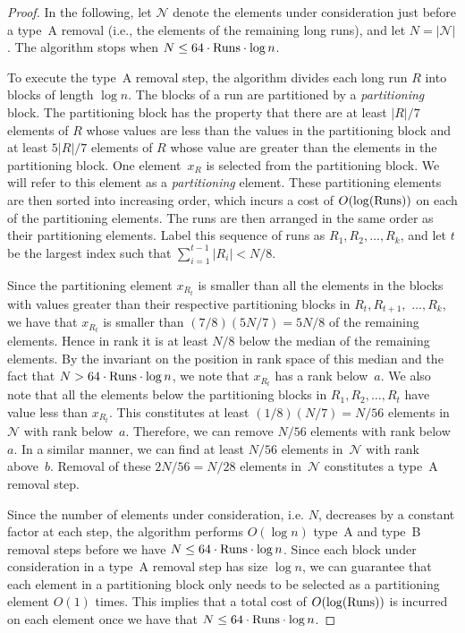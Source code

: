 \begin{proof}
In the following, let $\mathcal{N}$ denote the elements under
consideration just before a type~A removal (i.e., the elements of the
remaining long runs), and let $N = |\mathcal{N}|$. The algorithm stops
when $N \le 64 \cdot \mathrm{Runs} \cdot \log n$.

To execute the type~A removal step, the algorithm divides each long
run $R$ into blocks of length $\log n$. The blocks of a run are
partitioned by a {\em partitioning} block. The partitioning block has
the property that there are at least $|R|/7$ elements of $R$ whose
values are less than the values in the partitioning block and at least
$5|R|/7$ elements of $R$ whose value are greater than the elements in
the partitioning block. One element~$x_R$ is selected from the
partitioning block. We will refer to this element as a {\em
partitioning} element.
These partitioning elements are then sorted
into increasing order, which incurs a cost of $O(\log (\mathrm{Runs}))$ \frag
on each of the partitioning elements.  The runs are then arranged in
the same order as their partitioning elements.  Label this sequence of
runs as $R_1, R_2, \dots, R_k$, and let $t$ be the largest index such
that $\sum_{i=1}^{t-1} |R_i| < N/8.$

Since the partitioning element $x_{R_t}$ is smaller than all the elements in the blocks with values greater than their
respective partitioning blocks
in $R_t, R_{t+1},$ $\dots, R_k$, we have that $x_{R_t}$ is smaller than $(7/8)(5N/7) = 5N/8$ of the
remaining elements. Hence in rank it is at least $N/8$ below the median
of the remaining elements. By the invariant on the position in rank
space of this median and the fact that $N > 64 \cdot \mathrm{Runs} \cdot \log n$, we note
that $x_{R_t}$ has a rank below~$a$. We also note that all the elements
below the partitioning blocks in $R_1, R_{2}, \dots, R_t$ have value less than 
$x_{R_t}$. This constitutes at least $(1/8)(N/7) = N/56$
elements in~$\mathcal{N}$ with rank below~$a$. Therefore, 
we can remove $N/56$ elements with rank below~$a$. In a similar manner, we can find
at least $N/56$ elements in~$\mathcal{N}$ with rank
above~$b$. Removal of these $2N/56 = N/28$ elements
in~$\mathcal{N}$ constitutes a type~A removal step.

Since the number of elements under consideration, i.e. $N$, 
decreases by a constant factor at each step, the algorithm
performs $O(\log n)$ type~A and type~B removal steps before we have
$N \le 64 \cdot \mathrm{Runs} \cdot \log n$.  Since each block under 
consideration in a type~A removal step has size $\log n$, we can guarantee that each element in a
partitioning block
only needs to be selected as a partitioning element $O(1)$ times. This implies
that a total cost of $O(\log (\mathrm{Runs}))$ \frag is incurred on each
element once we have that $N \le 64 \cdot \mathrm{Runs} \cdot \log n$.


\end{proof}
